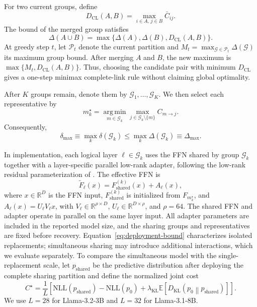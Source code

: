 \documentclass{article}
\newcommand{\NLL}{\mathrm{NLL}}
\newcommand{\KL}{D_{\mathrm{KL}}}
\newcommand{\argmin}{\operatorname*{arg\,min}}
\begin{document}
For two current groups, define
\begin{equation}
D_{\mathrm{CL}}(A,B)
=
\max_{i\in A,\,j\in B}\bar C_{ij}.
\label{eq:complete-link}
\end{equation}
The bound of the merged group satisfies
\begin{equation}
\Delta(A\cup B)
=
\max\{\Delta(A),\Delta(B),D_{\mathrm{CL}}(A,B)\}.
\label{eq:merge-identity}
\end{equation}
At greedy step $t$, let $\mathcal P_t$ denote the current partition and $M_t=\max_{\mathcal G\in\mathcal P_t}\Delta(\mathcal G)$ its maximum group bound. After merging $A$ and $B$, the new maximum is $\max\{M_t,D_{\mathrm{CL}}(A,B)\}$. Thus, choosing the candidate pair with
minimum $D_{\mathrm{CL}}$ gives a one-step minimax complete-link rule without
claiming global optimality.

After $K$ groups remain, denote them by
$\mathcal G_1,\ldots,\mathcal G_K$. We then select each representative by
\begin{equation}
m_k^\star
=
\argmin_{m\in\mathcal G_k}
\max_{j\in\mathcal G_k\setminus\{m\}}
C_{m\to j}.
\label{eq:representative}
\end{equation}
Consequently,
\begin{equation}
\delta_{\max}
\equiv
\max_k \delta(\mathcal G_k)
\leq
\max_k \Delta(\mathcal G_k)
\equiv
\Delta_{\max}.
\label{eq:deployment-bound}
\end{equation}

In implementation, each logical layer $\ell\in\mathcal G_k$ uses the FFN
shared by group $\mathcal G_k$ together with a layer-specific parallel
low-rank adapter, following the low-rank residual parameterization of
\cite{hu2022lora}. The effective FFN is
\begin{equation}
\widetilde F_\ell(x)
=
F_{\mathrm{shared}}^{(k)}(x)
+
A_\ell(x),
\label{eq:parallel-adapter}
\end{equation}
where $x\in\mathbb R^D$ is the FFN input,
$F_{\mathrm{shared}}^{(k)}$ is initialized from $F_{m_k^\star}$, and $A_\ell(x)=U_\ell V_\ell x$, with
$V_\ell\in\mathbb R^{\rho\times D}$,
$U_\ell\in\mathbb R^{D\times\rho}$, and $\rho=64$.
The shared FFN and adapter operate in parallel on the same layer input.
All adapter parameters are included in the reported model size, and the
sharing groups and representatives are fixed before recovery.
Equation~\eqref{eq:deployment-bound} characterizes isolated replacements;
simultaneous sharing may introduce additional interactions, which we evaluate
separately. To compare the simultaneous model with the single-replacement
scale, let $p_{\mathrm{shared}}$ be the predictive distribution after deploying
the complete sharing partition and define the normalized joint cost
\begin{equation}
C^\star
=
\frac{1}{L}\left[
\NLL(p_{\mathrm{shared}})-\NLL(p_0)
+\lambda_{\mathrm{KL}}\mathbb E\!\left[
\KL\!\left(p_0\middle\|p_{\mathrm{shared}}\right)
\right]\right].
\label{eq:c-star}
\end{equation}
We use $L=28$ for Llama-3.2-3B and $L=32$ for Llama-3.1-8B.
\end{document}
